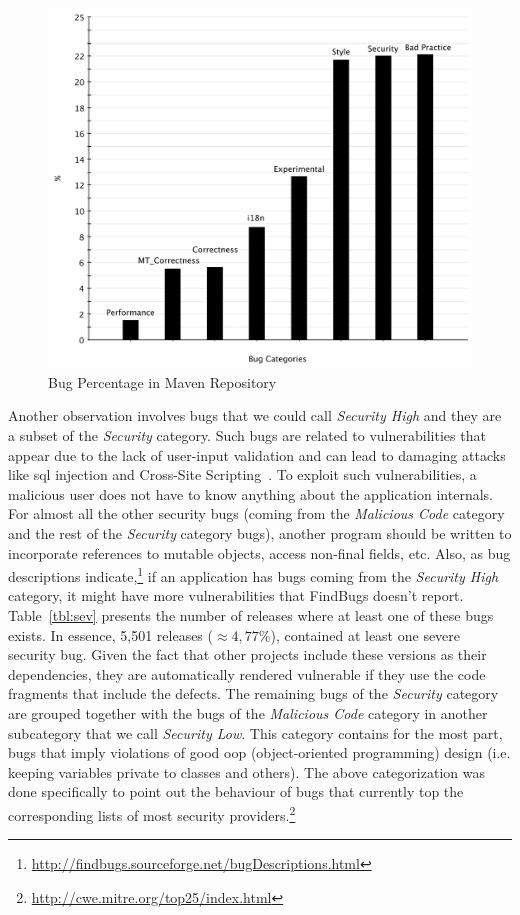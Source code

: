 \documentclass{sig-alternate}
\begin{document}
\begin{figure}[t]
	\centering
	\includegraphics[scale=0.39]{bug_percent}
	\caption{Bug Percentage in Maven Repository}
	\label{fig:bug-per} 
\end{figure}

Another observation involves bugs that we could call {\it
Security High} and they are a subset of the {\it Security} category.
Such bugs are related to vulnerabilities that appear due to the lack of user-input
validation and can lead to damaging attacks like {\sc sql} injection and
Cross-Site Scripting~\cite{RL12}.
To exploit such vulnerabilities, a malicious user does
not have to know anything about the application internals.
For almost all the other security bugs (coming from
the {\it Malicious Code} category and the rest of
the {\it Security} category bugs),
another program should be written to incorporate references to
mutable objects, access non-final fields, etc.
Also, as bug descriptions indicate,\footnote{\url{http://findbugs.sourceforge.net/bugDescriptions.html}}
if an application has bugs coming from the {\it Security High} category,
it might have more vulnerabilities that FindBugs doesn't report.
Table~\ref{tbl:sev} presents the number
of releases where at least one of these bugs exists. In essence, 5,501 releases
($\approx 4,77\% $), contained at
least one severe security bug. Given the fact that other projects include these
versions as their dependencies, they are automatically rendered vulnerable if
they use the code fragments that include the defects.
The remaining bugs of the {\it Security} category
are grouped together with the bugs of the {\it Malicious Code} category
in another subcategory that we call {\it Security Low}.
This category contains for the most part, bugs
that imply violations of good {\sc oop} (object-oriented programming)
design (i.e. keeping variables private to classes and others).
The above categorization was done specifically to point out the
behaviour of bugs that currently top the corresponding lists of most
security providers.\footnote{\url{http://cwe.mitre.org/top25/index.html}}
\end{document}
